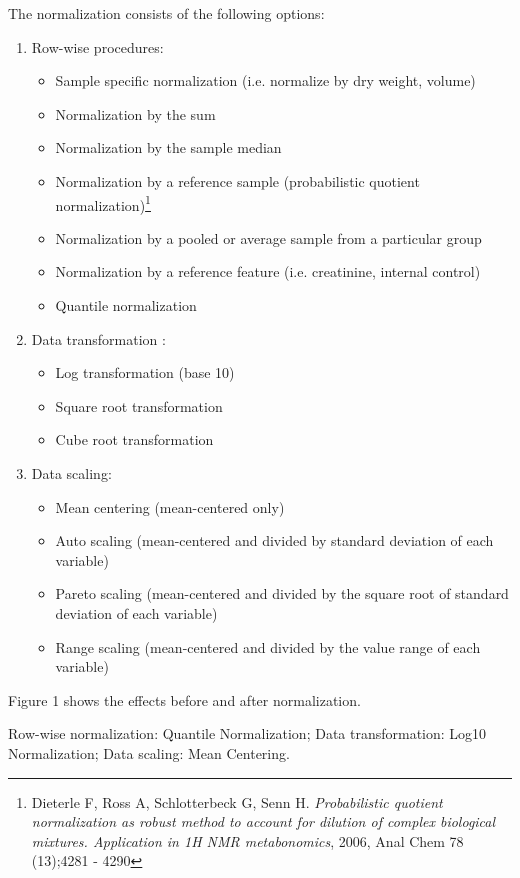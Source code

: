 \documentclass[a4paper]{article}
\begin{document}
 The normalization consists of the following options:\begin{enumerate}
\item{Row-wise procedures: }
\begin{itemize}
\item{Sample specific normalization (i.e. normalize by dry weight, volume) }
\item{Normalization by the sum }
\item{Normalization by the sample median }
\item{Normalization by a reference sample (probabilistic quotient
normalization)\footnote{Dieterle F, Ross A, Schlotterbeck G, Senn H. \textit{Probabilistic quotient normalization as robust
method to account for dilution of complex biological mixtures. Application in 1H NMR metabonomics}, 2006,
Anal Chem 78 (13);4281 - 4290}}
\item{Normalization by a pooled or average sample from a particular group }
\item{Normalization by a reference feature (i.e. creatinine, internal control) }
\item{Quantile normalization }
\end{itemize}
\item{Data transformation : }
\begin{itemize}
\item{Log transformation (base 10)}
\item{Square root transformation}
\item{Cube root transformation}
\end{itemize}
\item{Data scaling: }
\begin{itemize}
\item{Mean centering (mean-centered only)}
\item{Auto scaling (mean-centered and divided by standard deviation of each variable)}
\item{Pareto scaling (mean-centered and divided by the square root of standard deviation of each variable)}
\item{Range scaling (mean-centered and divided by the value range of each variable)}
\end{itemize}
\end{enumerate}



Figure 1 shows the effects before and after normalization.

Row-wise normalization: Quantile Normalization; Data transformation: Log10 Normalization; Data scaling: Mean Centering.
\end{document}
